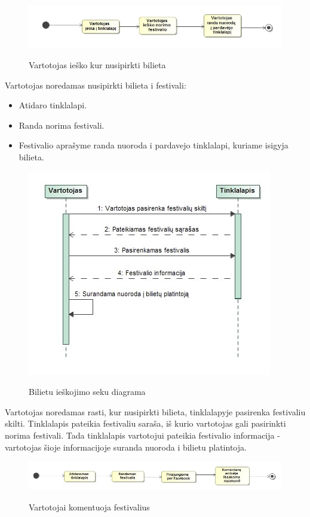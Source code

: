 ﻿\documentclass{VUMIFPSkursinis}
\begin{document}
\begin{figure}[H]
    \centering
    \includegraphics[scale=0.6]{img/geri/klientasBilietas}
    \label{img:uml5}
	\caption{Vartotojas ieško kur nusipirkti bilieta}
\end{figure}

Vartotojas noredamas nusipirkti bilieta i festivali:
\begin{itemize}
\item Atidaro tinklalapi.
\item Randa norima festivali.
\item Festivalio aprašyme randa nuoroda i pardavejo tinklalapi, kuriame isigyja bilieta.
\end{itemize}

\begin{figure}[H]
    \centering
    \includegraphics[scale=0.7]{img/geri/_klientasBilietas}
    \label{img:uml6}
	\caption{Bilietu ieškojimo seku diagrama}
\end{figure}

Vartotojas noredamas rasti, kur nusipirkti bilieta, tinklalapyje pasirenka festivaliu skilti. Tinklalapis pateikia festivaliu saraša, iš kurio vartotojas gali pasirinkti norima festivali. Tada tinklalapis vartotojui pateikia festivalio informacija - vartotojas šioje informacijoje suranda nuoroda i bilietu platintoja.

\begin{figure}[H]
    \centering
    \includegraphics[scale=0.5]{img/geri/klientasmintis}
    \label{img:uml7}
	\caption{Vartotojai komentuoja festivalius}
\end{figure}
\end{document}
